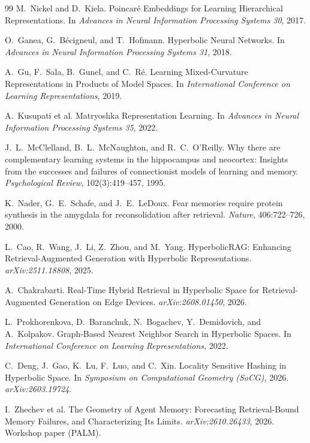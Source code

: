 \documentclass[11pt,a4paper]{article}
\begin{document}
\begin{thebibliography}{99}
 M.~Nickel and D.~Kiela.
\newblock Poincar\'e Embeddings for Learning Hierarchical Representations.
\newblock In \emph{Advances in Neural Information Processing Systems 30}, 2017.

 O.~Ganea, G.~B\'ecigneul, and T.~Hofmann.
\newblock Hyperbolic Neural Networks.
\newblock In \emph{Advances in Neural Information Processing Systems 31}, 2018.

 A.~Gu, F.~Sala, B.~Gunel, and C.~R\'e.
\newblock Learning Mixed-Curvature Representations in Products of Model Spaces.
\newblock In \emph{International Conference on Learning Representations}, 2019.

 A.~Kusupati et al.
\newblock Matryoshka Representation Learning.
\newblock In \emph{Advances in Neural Information Processing Systems 35}, 2022.

 J.~L.~McClelland, B.~L.~McNaughton, and R.~C.~O'Reilly.
\newblock Why there are complementary learning systems in the hippocampus and
neocortex: Insights from the successes and failures of connectionist models
of learning and memory.
\newblock \emph{Psychological Review}, 102(3):419--457, 1995.

 K.~Nader, G.~E.~Schafe, and J.~E.~LeDoux.
\newblock Fear memories require protein synthesis in the amygdala for
reconsolidation after retrieval.
\newblock \emph{Nature}, 406:722--726, 2000.

 L.~Cao, R.~Wang, J.~Li, Z.~Zhou, and M.~Yang.
\newblock HyperbolicRAG: Enhancing Retrieval-Augmented Generation with Hyperbolic Representations.
\newblock \emph{arXiv:2511.18808}, 2025.

 A.~Chakrabarti.
\newblock Real-Time Hybrid Retrieval in Hyperbolic Space for Retrieval-Augmented Generation on Edge Devices.
\newblock \emph{arXiv:2608.01450}, 2026.

 L.~Prokhorenkova, D.~Baranchuk, N.~Bogachev, Y.~Demidovich, and A.~Kolpakov.
\newblock Graph-Based Nearest Neighbor Search in Hyperbolic Spaces.
\newblock In \emph{International Conference on Learning Representations}, 2022.

 C.~Deng, J.~Gao, K.~Lu, F.~Luo, and C.~Xin.
\newblock Locality Sensitive Hashing in Hyperbolic Space.
\newblock In \emph{Symposium on Computational Geometry (SoCG)}, 2026.
\newblock \emph{arXiv:2603.19724}.

 I.~Zhechev et al.
\newblock The Geometry of Agent Memory: Forecasting Retrieval-Bound Memory
Failures, and Characterizing Its Limits.
\newblock \emph{arXiv:2610.26433}, 2026. Workshop paper (PALM).


\end{thebibliography}
\end{document}
